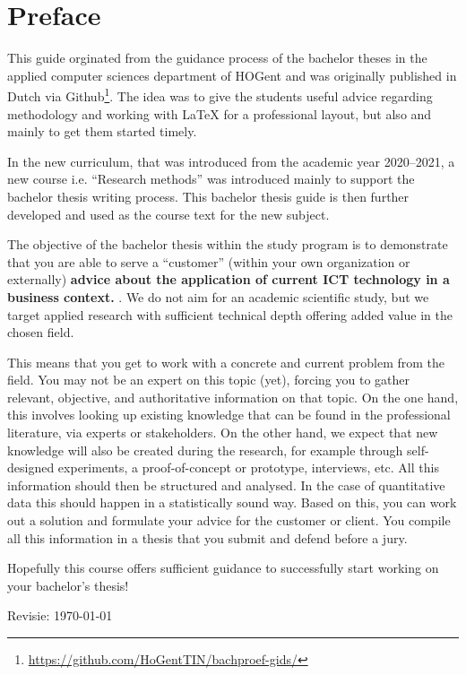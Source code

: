 \chapter*{Preface}
\label{ch:preface}

This guide orginated from the guidance process of the bachelor theses in the applied computer sciences department of HOGent and was originally published in Dutch via  Github\footnote{\url{https://github.com/HoGentTIN/bachproef-gids/}}. The idea was to give the students useful advice regarding methodology and working with {\LaTeX} for a professional layout, but also and mainly to get them started timely.

In the new curriculum, that was introduced from the academic year 2020--2021, a new course i.e. ``Research methods'' was introduced mainly to support the bachelor thesis writing process. This bachelor thesis guide is then further developed and used as the course text for the new subject.

The objective of the bachelor thesis within the study program is to demonstrate that you are able to serve a ``customer'' (within your own organization or externally) \textbf{advice about the application of current ICT technology in a business context. }. We do not aim for an academic scientific study, but we target applied research with sufficient technical depth offering added value in the chosen field.

This means that you get to work with a concrete and current problem from the field. You may not be an expert on this topic (yet), forcing you to gather relevant, objective, and authoritative information on that topic. On the one hand, this involves looking up existing knowledge that can be found in the professional literature, via experts or stakeholders. On the other hand, we expect that new knowledge will also be created during the research, for example through self-designed experiments, a proof-of-concept or prototype, interviews, etc. All this information should then be structured and analysed. In the case of quantitative data this should happen in a statistically sound way. Based on this, you can work out a solution and formulate your advice for the customer or client. You compile all this information in a thesis that you submit and defend before a jury.

Hopefully this course offers sufficient guidance to successfully start working on your bachelor's thesis!

\bigskip
Revisie: \today